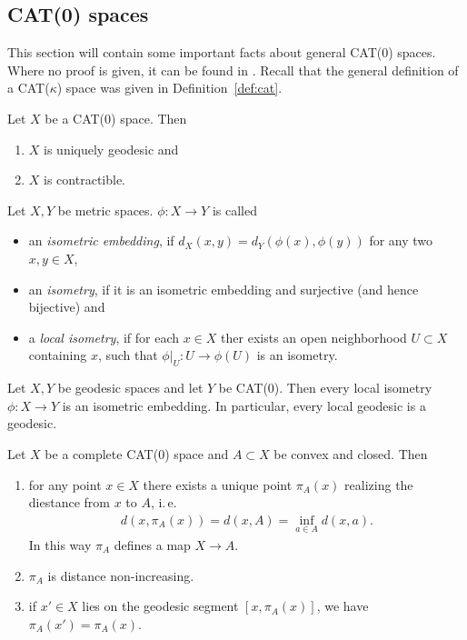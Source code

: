 \subsection{CAT(0) spaces}
\label{sec:cat(0)}

This section will contain some important facts about general CAT(0) spaces. Where no proof is given, it can be found in \cite{MR1744486}. Recall that the general definition of a CAT(\(\kappa\)) space was given in Definition~\ref{def:cat}. 

\begin{prop}[{\cite[Prop II.1.4]{MR1744486}}]
  Let \(X\) be a CAT(0) space. Then
  \begin{enumerate}
  \item \(X\) is uniquely geodesic and
  \item \(X\) is contractible.
  \end{enumerate}
\end{prop}

\begin{defin}
  Let \(X,Y\) be metric spaces. \(\phi \colon X \to Y\) is called
  \begin{itemize}
  \item an \emph{isometric embedding}, if \(d_X(x,y) = d_Y(\phi(x), \phi(y))\) for any two \(x,y \in X\),
  \item an \emph{isometry}, if it is an isometric embedding and surjective (and hence bijective) and
  \item a \emph{local isometry}, if for each \(x \in X\) ther exists an open neighborhood \(U \subset X\) containing \(x\), such that \(\phi|_U \colon U \to \phi(U)\) is an isometry.
  \end{itemize}
\end{defin}

\begin{prop}
  Let \(X,Y\) be geodesic spaces and let \(Y\) be CAT(0). Then every local isometry \(\phi \colon X \to Y\) is an isometric embedding. In particular, every local geodesic is a geodesic.
\end{prop}


\begin{prop}
  Let \(X\) be a complete CAT(0) space and \(A \subset X\) be convex and closed. Then
  \begin{enumerate}
  \item for any point \(x \in X\) there exists a unique point \(\pi_A(x)\) realizing the diestance from \(x\) to \(A\), i.\,e.
    \begin{align*}
      d(x, \pi_A(x)) = d(x, A) = \inf_{a \in A} d(x, a).
    \end{align*}
    In this way \(\pi_A\) defines a map \(X \to A\).
  \item \(\pi_A\) is distance non-increasing.
  \item if \(x' \in X\) lies on the geodesic segment \(\left[x, \pi_A(x)\right]\), we have \(\pi_A(x') = \pi_A(x)\).
  \end{enumerate}
\end{prop}

